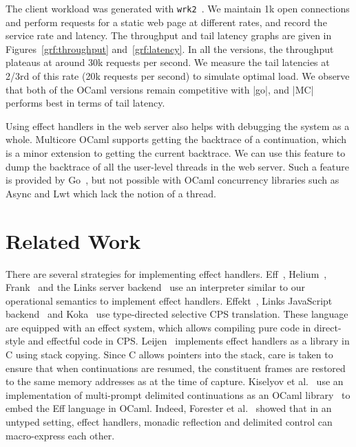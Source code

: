 \documentclass[sigplan,10pt,review,anonymous]{acmart}\settopmatter{printfolios=true,printccs=false,printacmref=false}
\begin{document}
The client workload was generated with \texttt{wrk2}~\cite{wrk2}. We maintain
1k open connections and perform requests for a static web page at different
rates, and record the service rate and latency. The throughput and tail latency
graphs are given in Figures~\ref{grf:throughput} and~\ref{grf:latency}. In all
the versions, the throughput plateaus at around 30k requests per second. We
measure the tail latencies at 2/3rd of this rate (20k requests per second) to
simulate optimal load. We observe that both of the OCaml versions remain
competitive with |go|, and |MC| performs best in terms of tail latency.

Using effect handlers in the web server also helps with debugging the system as
a whole. Multicore OCaml supports getting the backtrace of a continuation,
which is a minor extension to getting the current backtrace. We can use this
feature to dump the backtrace of all the user-level threads in the web server.
Such a feature is provided by Go~\cite{gopprof}, but not possible with OCaml
concurrency libraries such as Async and Lwt which lack the notion of a thread.

\vspace{-2mm}
\section{Related Work}
\label{sec:related}

There are several strategies for implementing effect handlers. Eff~\cite{Eff},
Helium~\cite{Biernacki20}, Frank~\cite{Frank} and the Links server
backend~\cite{Hillerstrom20} use an interpreter similar to our operational
semantics to implement effect handlers. Effekt~\cite{Effekt}, Links JavaScript
backend~\cite{Hillerstrom20} and Koka~\cite{Leijen17} use type-directed
selective CPS translation. These language are equipped with an effect system,
which allows compiling pure code in direct-style and effectful code in CPS.
Leijen~\cite{Leijen14} implements effect handlers as a library in C using stack
copying. Since C allows pointers into the stack, care is taken to ensure that
when continuations are resumed, the constituent frames are restored to the same
memory addresses as at the time of capture. Kiselyov et al.~\cite{Kiselyov18}
use an implementation of multi-prompt delimited continuations as an OCaml
library~\cite{Kiselyov12} to embed the Eff language in OCaml. Indeed, Forester et
al.~\cite{Forster19} showed that in an untyped setting, effect handlers,
monadic reflection and delimited control can macro-express each other.
\end{document}
